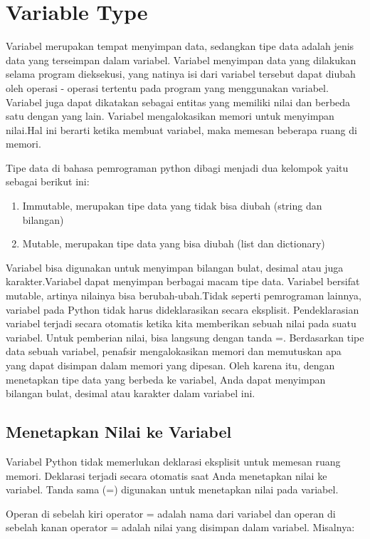 \documentclass[12pt]{article}
\begin{document}
\section{Variable Type}
Variabel merupakan tempat menyimpan data, sedangkan tipe data adalah jenis data yang terseimpan dalam variabel. Variabel menyimpan data yang dilakukan selama program dieksekusi, yang natinya isi dari variabel tersebut dapat diubah oleh operasi - operasi tertentu pada program yang menggunakan variabel. Variabel juga dapat dikatakan sebagai entitas yang memiliki nilai dan berbeda satu dengan yang lain. Variabel mengalokasikan memori untuk menyimpan nilai.Hal ini berarti ketika membuat variabel, maka  memesan beberapa ruang di memori. 

Tipe data di bahasa pemrograman python dibagi menjadi dua kelompok yaitu sebagai berikut ini:
\begin{enumerate}
	\item Immutable, merupakan tipe data yang tidak bisa diubah (string dan bilangan)
	\item Mutable, merupakan tipe data yang bisa diubah (list dan dictionary)
\end{enumerate}  

Variabel bisa digunakan untuk menyimpan bilangan bulat, desimal atau juga karakter.Variabel dapat menyimpan berbagai macam tipe data. Variabel bersifat mutable, artinya nilainya bisa berubah-ubah.Tidak seperti pemrograman lainnya, variabel pada Python tidak harus dideklarasikan secara eksplisit. Pendeklarasian variabel terjadi secara otomatis ketika kita memberikan sebuah nilai pada suatu variabel. Untuk pemberian nilai, bisa langsung dengan tanda =. Berdasarkan tipe data sebuah variabel, penafsir mengalokasikan memori dan memutuskan apa yang dapat disimpan dalam memori yang dipesan. Oleh karena itu, dengan menetapkan tipe data yang berbeda ke variabel, Anda dapat menyimpan bilangan bulat, desimal atau karakter dalam variabel ini.

\subsection{Menetapkan Nilai ke Variabel}
Variabel Python tidak memerlukan deklarasi eksplisit untuk memesan ruang memori. Deklarasi terjadi secara otomatis saat Anda menetapkan nilai ke variabel. Tanda sama (=) digunakan untuk menetapkan nilai pada variabel.

Operan di sebelah kiri operator = adalah nama dari variabel dan operan di sebelah kanan operator = adalah nilai yang disimpan dalam variabel. Misalnya:
\end{document}
